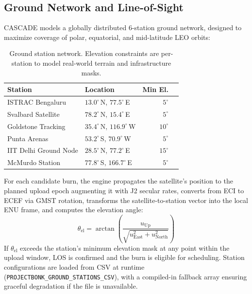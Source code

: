 \documentclass[10pt,twocolumn,letterpaper]{article}
\begin{document}
\subsection{Ground Network and Line-of-Sight}\label{sec:los}

CASCADE models a globally distributed 6-station ground network, designed
to maximize coverage of polar, equatorial, and mid-latitude LEO orbits:

\begin{table}[h]
\centering\small
\begin{tabular}{@{}llrc@{}}
\toprule
\textbf{Station} & \textbf{Location} & \textbf{Min El.} \\
\midrule
ISTRAC Bengaluru     & $13.0^{\circ}$\,N, $77.5^{\circ}$\,E  & $5^{\circ}$  \\
Svalbard Satellite   & $78.2^{\circ}$\,N, $15.4^{\circ}$\,E  & $5^{\circ}$  \\
Goldstone Tracking   & $35.4^{\circ}$\,N, $116.9^{\circ}$\,W & $10^{\circ}$ \\
Punta Arenas         & $53.2^{\circ}$\,S, $70.9^{\circ}$\,W  & $5^{\circ}$  \\
IIT Delhi Ground Node& $28.5^{\circ}$\,N, $77.2^{\circ}$\,E  & $15^{\circ}$ \\
McMurdo Station      & $77.8^{\circ}$\,S, $166.7^{\circ}$\,E & $5^{\circ}$  \\
\bottomrule
\end{tabular}
\caption{Ground station network.  Elevation constraints are per-station to
  model real-world terrain and infrastructure masks.}
\label{tab:gs}
\end{table}

\noindent
For each candidate burn, the engine propagates the satellite's position to
the planned upload epoch augmenting it with J2 secular rates, converts from
ECI to ECEF via GMST rotation, transforms the satellite-to-station vector
into the local ENU frame, and computes the elevation angle:
%
\begin{equation}
  \theta_{\text{el}} = \arctan\!\left(\frac{u_{\text{Up}}}
    {\sqrt{u_{\text{East}}^2 + u_{\text{North}}^2}}\right)
\end{equation}
%
If $\theta_{\text{el}}$ exceeds the station's minimum elevation mask at
any point within the upload window, LOS is confirmed and the burn is
eligible for scheduling.  Station configurations are loaded from CSV at
runtime (\texttt{PROJECTBONK\_GROUND\_STATIONS\_CSV}), with a compiled-in
fallback array ensuring graceful degradation if the file is unavailable.
\end{document}
